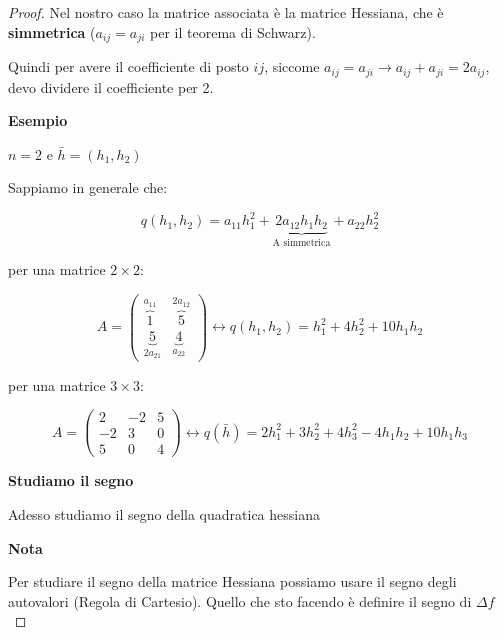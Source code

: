 \documentclass[../appunti-analisi.tex]{subfiles}
\begin{document}
\begin{proof}
       Nel nostro caso la matrice associata è la matrice Hessiana, che è \textbf{simmetrica} ($a_{ij} = a_{ji}$ per il teorema di Schwarz).

       Quindi per avere il coefficiente di posto $ij$, siccome $a_{ij} = a_{ji} \rightarrow a_{ij} + a_{ji} = 2a_{ij}$, devo dividere il coefficiente per 2.


\textbf{Esempio} 

$n=2$ e $\bar{h} =(h_1,h_2)$

Sappiamo in generale che:

\[
    q(h_1,h_2) = a_{11} h_1^{2} + \underbrace{2a_{12} h_1 h_2}_\text{A simmetrica} + a_{22}h_2^{2}
\]

per una matrice $2\times 2$:

\[
    A= \begin{pmatrix}
        \overbrace{1}^\text{$a_{11}$} & \overbrace{5}^\text{$2a_{12}$}\\
        \underbrace{5}_\text{$2a_{21}$} & \underbrace{4}_\text{$a_{22}$}
    \end{pmatrix} \leftrightarrow 
    q(h_1,h_2) = h_1^{2}+4 h_2^{2}+ 10 h_1 h_2
\]

per una matrice $3\times 3$:

\[
    A = \begin{pmatrix}
    2 & -2 & 5\\
    -2 & 3 & 0\\
    5 & 0 & 4
    \end{pmatrix} \leftrightarrow
    q(\bar{h} ) = 2 h_1^{2}+3 h_2^{2}+ 4 h_3^{2} - 4 h_1 h_2 + 10 h_1 h_3
\]

\newpage

\textbf{Studiamo il segno} 

Adesso studiamo il segno della quadratica hessiana




\textbf{Nota} 

Per studiare il segno della matrice Hessiana possiamo usare il segno degli autovalori (Regola di Cartesio). Quello che sto facendo è definire il segno di $\Delta f$


\end{proof}
\end{document}
